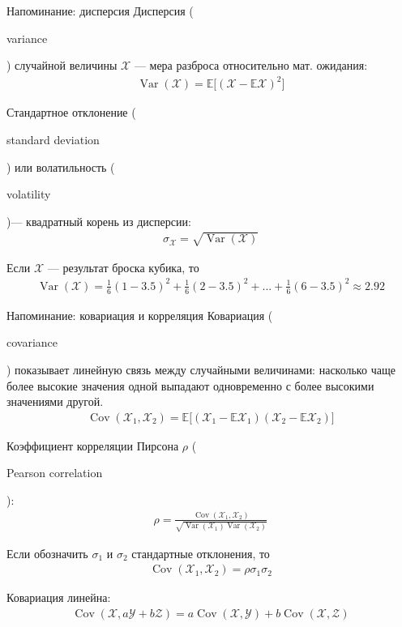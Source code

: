 \documentclass{beamer}
\newcommand{\en}[1]{\begin{otherlanguage}{english}#1\end{otherlanguage}}
\begin{document}
\begin{frame}{Напоминание: дисперсия}
\justify
Дисперсия (\en{variance}) случайной величины $\mathcal{X}$ --- мера разброса 
относительно мат. ожидания:
\begin{align*}
\operatorname{Var}(\mathcal{X})
= \mathbb{E}\Big[(\mathcal{X} - \mathbb{E}\mathcal{X})^2\Big]
\end{align*}

\justify
Стандартное отклонение (\en{standard deviation}) или волатильность 
(\en{volatility})--- квадратный корень из дисперсии:
\begin{align*}
\sigma_{\mathcal{X}} = \sqrt{\operatorname{Var}(\mathcal{X})}
\end{align*}

\justify
Если $\mathcal{X}$ --- результат броска кубика, то
\begin{align*}
\operatorname{Var}(\mathcal{X}) 
= \frac{1}{6}(1 - 3.5)^2 + \frac{1}{6}(2 - 3.5)^2 + ... + \frac{1}{6}(6-3.5)^2 
\approx 2.92
\end{align*}
\end{frame}



\begin{frame}{Напоминание: ковариация и корреляция}
\justify
Ковариация (\en{covariance}) показывает линейную связь между случайными величинами: насколько чаще более высокие значения одной выпадают одновременно 
с более высокими значениями другой.
\begin{align*}
\operatorname{Cov}(\mathcal{X}_1, \mathcal{X}_2) =
\mathbb{E}\Big[(\mathcal{X}_1 - \mathbb{E}\mathcal{X}_1)
(\mathcal{X}_2 - \mathbb{E}\mathcal{X}_2)\Big]
\end{align*}

\justify
Коэффициент корреляции Пирсона $\rho$ (\en{Pearson correlation}):
\begin{align*}
\rho =
\frac{
	\operatorname{Cov}(\mathcal{X}_1, \mathcal{X}_2)
}{
	\sqrt{\operatorname{Var}(\mathcal{X}_1)\operatorname{Var}(\mathcal{X}_2)}
}
\end{align*}

\justify
Если обозначить $\sigma_1$ и $\sigma_2$ стандартные 
отклонения, то
\begin{align*}
\operatorname{Cov}(\mathcal{X}_1, \mathcal{X}_2) 
= \rho\sigma_1\sigma_2
\end{align*}

\justify
Ковариация линейна:
\begin{align*}
\operatorname{Cov}(\mathcal{X}, a\mathcal{Y} + b\mathcal{Z}) =
a\operatorname{Cov}(\mathcal{X}, \mathcal{Y}) +
b\operatorname{Cov}(\mathcal{X}, \mathcal{Z})
\end{align*}
\end{frame}
\end{document}

